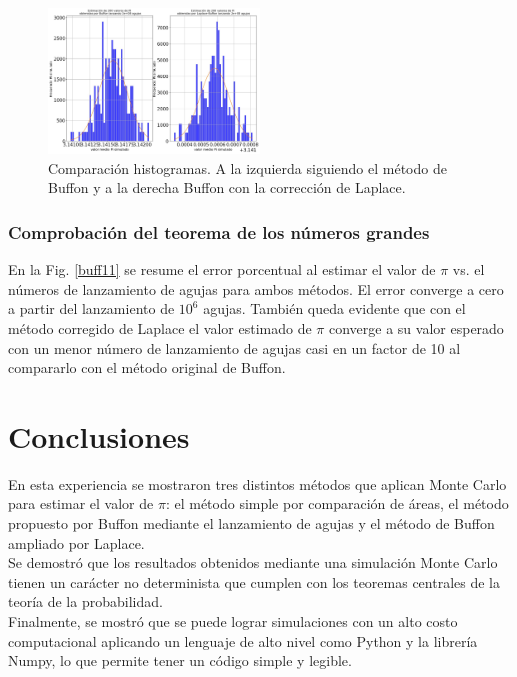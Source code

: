 \documentclass{rbf}
\begin{document}
\begin{figure}[h]
 \centering
  \includegraphics[width=0.5\textwidth]{figures/lap.jpg}
	\caption{Comparación histogramas. A la izquierda siguiendo el método de Buffon y a la derecha Buffon con la corrección de Laplace.}
 \label{buff10}
\end{figure}



\subsubsection{Comprobación del teorema de los números grandes}

En la Fig. \ref{buff11} se resume el error porcentual al estimar el valor de $\pi$ vs. el números de lanzamiento de agujas para ambos métodos. El error converge a cero a partir del lanzamiento de $10^6$ agujas.
También queda evidente que con el método corregido de Laplace el valor estimado de $\pi$ converge a su valor esperado con un menor número de lanzamiento de agujas casi en un factor de 10 al compararlo con el método original de Buffon. 


\section{Conclusiones}

En esta experiencia se mostraron tres distintos métodos que aplican Monte Carlo para estimar el valor de $\pi$: el método simple por comparación de áreas, el método propuesto por Buffon mediante el lanzamiento de agujas y el método de Buffon ampliado por Laplace. \\
Se demostró que los resultados obtenidos mediante una simulación Monte Carlo tienen un carácter no determinista que cumplen con los teoremas centrales de la teoría de la probabilidad. \\

Finalmente, se mostró que se puede lograr simulaciones con un alto costo computacional aplicando un lenguaje de alto nivel como Python y la librería Numpy, lo que permite tener un código simple y legible.
\end{document}
